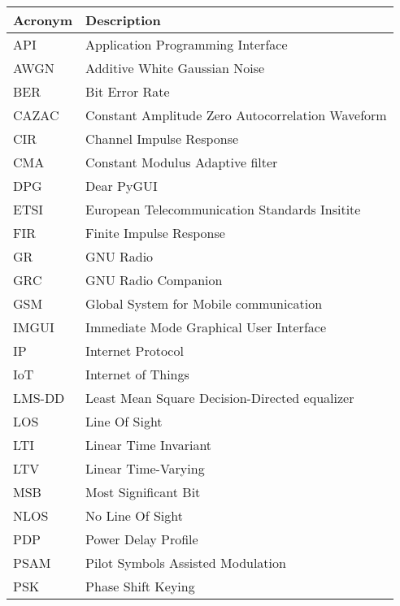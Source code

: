 \documentclass[
	overfullrule,
	paper = a4, twoside, openright, BCOR = 5mm,
	headinclude, footexclude,
	fontsize = 11pt,
	cleardoublepage = empty,
	titlepage, abstract = on,
	automark,
	numbers = noenddot
]{scrreprt}
\begin{document}
	\begin{tabularx}{\linewidth}{l X}
		\toprule
		\bfseries Acronym & \bfseries Description \\
		\midrule
		API    & Application Programming Interface                \\
		AWGN   & Additive White Gaussian Noise                    \\
		BER    & Bit Error Rate                                   \\
		CAZAC  & Constant Amplitude Zero Autocorrelation Waveform \\
		CIR    & Channel Impulse Response                         \\
		CMA    & Constant Modulus Adaptive filter                 \\
		DPG    & Dear PyGUI                                       \\
		ETSI   & European Telecommunication Standards Insitite    \\
		FIR    & Finite Impulse Response                          \\
		GR     & GNU Radio                                        \\
		GRC    & GNU Radio Companion                              \\
		GSM    & Global System for Mobile communication           \\
		IMGUI  & Immediate Mode Graphical User Interface          \\
		IP     & Internet Protocol                                \\
		IoT    & Internet of Things                               \\
		LMS-DD & Least Mean Square Decision-Directed equalizer    \\
		LOS    & Line Of Sight                                    \\
		LTI    & Linear Time Invariant                            \\
		LTV    & Linear Time-Varying                              \\
		MSB    & Most Significant Bit                             \\
		NLOS   & No Line Of Sight                                 \\
		PDP    & Power Delay Profile                              \\
		PSAM   & Pilot Symbols Assisted Modulation                \\
		PSK    & Phase Shift Keying                               \\

\end{tabularx}
\end{document}
